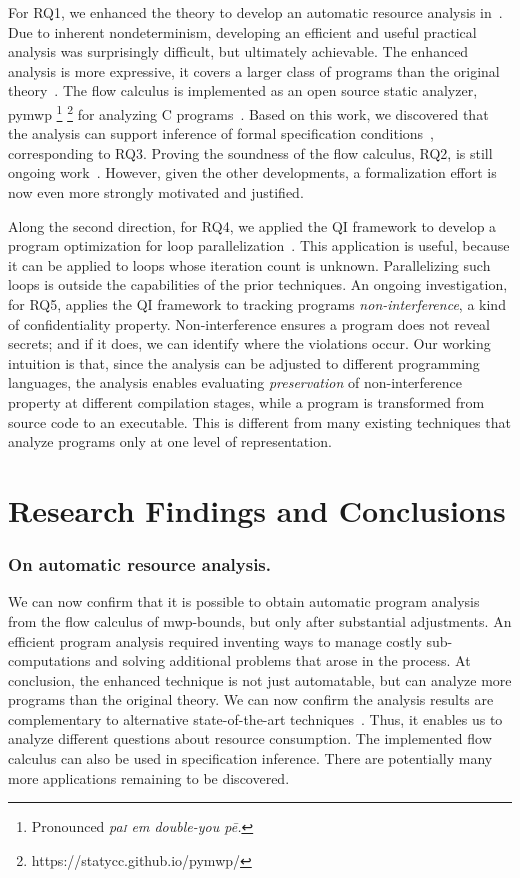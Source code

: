 For RQ1, we enhanced the theory to develop an automatic resource analysis in~\cite{aubert20222,aubert2023b,rusch2025}.
Due to inherent nondeterminism, developing an efficient and useful practical analysis was surprisingly difficult, but ultimately achievable.
The enhanced analysis is more expressive,
\ie it covers a larger class of programs than the original theory~\cite{rusch2025}.
The flow calculus is implemented as an open source static analyzer, pymwp%
\footnote{Pronounced \emph{pa\textsc{i} em double-you p\={e}.}}%
\footnote{https://statycc.github.io/pymwp/}{ }for analyzing C programs~\cite{aubert2023b}.
Based on this work, we discovered that the analysis can support
inference of formal specification conditions~\cite{rusch2025}, corresponding to RQ3.
Proving the soundness of the flow calculus, RQ2, is still ongoing work~\cite{aubert20232}.
However, given the other developments, a formalization effort is now even more strongly motivated and justified.

Along the second direction, for RQ4, we applied the QI framework to develop a program optimization for loop parallelization~\cite{aubert20232}.
This application is useful, because it can be applied to loops whose iteration count is unknown.
Parallelizing such loops is outside the capabilities of the prior techniques.
An ongoing investigation, for RQ5, applies the QI framework to tracking programs \emph{non\hyp{}interference}, a kind of confidentiality property.
Non-interference ensures a program does not reveal secrets;
and if it does, we can identify where the violations occur.
Our working intuition is that, since the analysis can be adjusted to different programming languages, the analysis enables evaluating \emph{preservation} of non-interference property at different compilation stages, while a program is transformed from source code to an executable.
This is different from many existing techniques that analyze programs only at one level of representation.

\section{Research Findings and Conclusions}
\label{aicc-discussion}

\subsubsection*{On automatic resource analysis.}
We can now confirm that it is possible to obtain automatic program analysis from the flow calculus of mwp-bounds, but only after substantial adjustments.
An efficient program analysis required inventing ways to manage costly sub-computations and solving additional problems that arose in the process.
At conclusion, the enhanced technique is not just automatable, but can analyze more programs than the original theory.
We can now confirm the analysis results are complementary to alternative state-of-the-art techniques~\cite[p. 5]{aubert2023b}.
Thus, it enables us to analyze different questions about resource consumption.
The implemented flow calculus can also be used in specification inference.
There are potentially many more applications remaining to be discovered.

